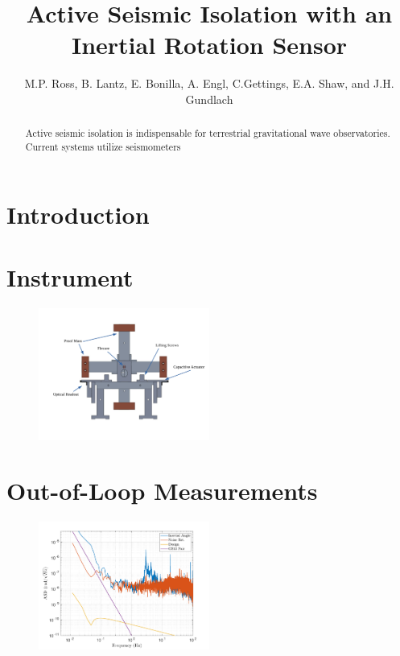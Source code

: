 \documentclass[twocolumn]{revtex4-1}
\begin{document}
\title{Active Seismic Isolation with an Inertial Rotation Sensor}
\author{M.P. Ross, B. Lantz, E. Bonilla, A. Engl,  C.Gettings, E.A. Shaw,  and J.H. Gundlach}

\begin{abstract}

Active seismic isolation is indispensable for terrestrial gravitational wave observatories. Current systems utilize seismometers 

\end{abstract}

\maketitle

\section{Introduction}

\section{Instrument}

\begin{figure}[!h]
\centering \includegraphics[width=0.5\textwidth]{cBRSFrontLabeled.pdf}
\caption{}
\label{apparatus} 
\end{figure}

\section{Out-of-Loop Measurements}

\begin{figure}[!h]
\centering \includegraphics[width=0.5\textwidth]{cBRS_Stanford_InAir_TableLocked.pdf}
\caption{}
\label{outloop} 
\end{figure}
\end{document}

